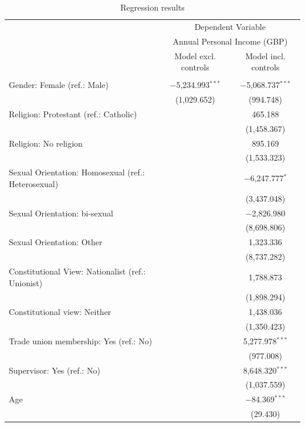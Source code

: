 \documentclass[
]{article}
\begin{document}
\begin{table}[H] \centering 
  \caption{Regression results} 
  \label{} 
\small 
\begin{tabular}{@{\hspace{5pt}}l@{\hspace{5pt}}cc} 
\toprule 
 & \multicolumn{2}{c}{Dependent Variable} \\ 
\cmidrule(rr){2-3} 
 & \multicolumn{2}{c}{Annual Personal Income (GBP)} \\ 
 \cmidrule(rr){2-3}
 & Model excl. controls & Model incl. controls \\ 
\midrule  
\\[-2.1ex] Gender: Female (ref.: Male) & $-$5,234.993$^{***}$ & $-$5,068.737$^{***}$ \\ 
  & (1,029.652) & (994.748) \\ 
 \addlinespace 
 Religion: Protestant (ref.: Catholic) &  & 465.188 \\ 
  &  & (1,458.367) \\ 
 \addlinespace 
 Religion: No religion &  & 895.169 \\ 
  &  & (1,533.323) \\ 
 \addlinespace 
 Sexual Orientation: Homosexual (ref.: Heterosexual) &  & $-$6,247.777$^{*}$ \\ 
  &  & (3,437.048) \\ 
 \addlinespace 
 Sexual Orientation: bi-sexual &  & $-$2,826.980 \\ 
  &  & (8,698.806) \\ 
 \addlinespace 
 Sexual Orientation: Other &  & 1,323.336 \\ 
  &  & (8,737.282) \\ 
 \addlinespace 
 Constitutional View: Nationalist (ref.: Unionist) &  & 1,788.873 \\ 
  &  & (1,898.294) \\ 
 \addlinespace 
 Constitutional view: Neither &  & 1,438.036 \\ 
  &  & (1,350.423) \\ 
 \addlinespace 
 Trade union membership: Yes (ref.: No) &  & 5,277.978$^{***}$ \\ 
  &  & (977.008) \\ 
 \addlinespace 
 Supervisor: Yes (ref.: No) &  & 8,648.320$^{***}$ \\ 
  &  & (1,037.559) \\ 
 \addlinespace 
 Age &  & $-$84.369$^{***}$ \\ 
  &  & (29.430) \\ 

\end{tabular}
\end{table}
\end{document}
